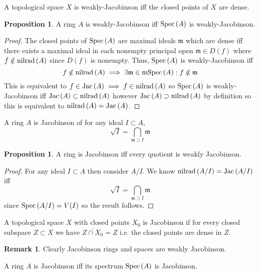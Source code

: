 \documentclass[12pt]{extarticle}
\theoremstyle{definition}
\newtheorem{proposition}[theorem]{Proposition}
\newtheorem{remark}{Remark}
\newenvironment{definition}[1][Definition:]{\begin{trivlist}
\item[\hskip \labelsep {\bfseries #1}]}{\end{trivlist}}
\newcommand{\m}{\mathfrak{m}}
\begin{document}
\begin{definition}
A topological space $X$ is weakly-Jacobinson iff the closed points of $X$ are dense.
\end{definition}

\begin{proposition}
A ring $A$ is weakly-Jacobinson iff $\mathrm{Spec}\left(A\right)$ is weakly-Jacobinson.
\end{proposition}

\begin{proof}
The closed points of $\mathrm{Spec}\left(A\right)$ are maximal ideals $\m$ which are dense iff there exists a maximal ideal in each nonempty principal open $\m \in D(f)$ where $f \notin \mathrm{nilrad}\left(A\right)$ since $D(f)$ is nonempty. Thus, $\mathrm{Spec}\left(A\right)$ is weakly-Jacobinson iff 
\[ f \notin \nilrad{A} \implies \exists \m \in \mSpec{A} : f \notin \m \]  
This is equivalent to $f \in \mathrm{Jac}\left( A \right) \implies f \in \mathrm{nilrad}\left(A\right)$ so $\mathrm{Spec}\left(A\right)$ is weakly-Jacobinson iff $\mathrm{Jac}\left( A \right) \subset \mathrm{nilrad}\left(A\right)$ however $\mathrm{Jac}\left( A \right) \supset \mathrm{nilrad}\left(A\right)$ by definition so this is equivalent to $\mathrm{nilrad}\left(A\right) = \mathrm{Jac}\left( A \right)$.
\end{proof}

\begin{definition}
A ring $A$ is Jacobinson of for any ideal $I \subset A$,
\[ \sqrt{I} = \bigcap_{\m \supset I} \m \]
\end{definition}

\begin{proposition}
A ring is Jacobinson iff every quotient is weakly Jacobinson.
\end{proposition}

\begin{proof}
For any ideal $I \subset A$ then consider $A / I$. We know $\mathrm{nilrad}\left(A / I\right) = \mathrm{Jac}\left( A / I \right)$ iff
\[ \sqrt{I} = \bigcap_{\m \supset I} \m \]
since $\mathrm{Spec}\left(A / I\right) = V(I)$ so the result follows.
\end{proof}

\begin{definition}
A topological space $X$ with closed points $X_0$ is Jacobinson if for every closed subspace $Z \subset X$ we have $\overline{Z \cap X_0} = Z$ i.e. the closed points are dense in $Z$. 
\end{definition}

\begin{remark}
Clearly Jacobinson rings and spaces are weakly Jacobinson. 
\end{remark}

\begin{definition}
A ring $A$ is Jacobinson iff its spectrum $\mathrm{Spec}\left(A\right)$ is Jacobinson.
\end{definition}
\end{document}
